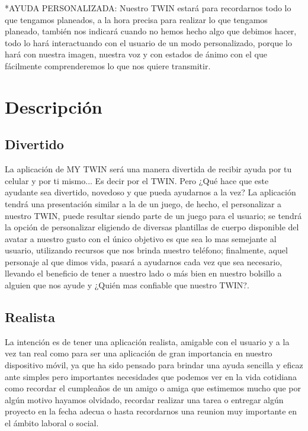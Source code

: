\documentclass[12pt]{article}
\begin{document}
\hspace{0.2in}*AYUDA PERSONALIZADA: Nuestro TWIN estará para recordarnos todo lo que tengamos planeados, a la hora precisa para realizar lo que tengamos planeado, también nos indicará cuando no hemos hecho algo que debimos hacer, todo lo hará interactuando con el usuario de un modo personalizado, porque lo hará con nuestra imagen, nuestra voz y con estados de ánimo con el que fácilmente comprenderemos lo que nos quiere transmitir.

\newpage
\section{Descripción}

\subsection{Divertido}
La aplicación de MY TWIN será una manera divertida de recibir ayuda por tu celular y por ti mismo... Es decir por el TWIN.
Pero ¿Qué hace que este ayudante sea divertido, novedoso y que pueda ayudarnos a la vez?
La aplicación tendrá una presentación similar a la de un juego, de hecho, el personalizar a nuestro TWIN, puede resultar siendo parte de un juego para el usuario; se tendrá la opción de personalizar eligiendo de diversas plantillas de cuerpo disponible del avatar a nuestro gusto con el único objetivo es que sea lo mas semejante al usuario, utilizando recursos que nos brinda nuestro teléfono; finalmente, aquel personaje al que dimos vida, pasará a ayudarnos cada vez que sea necesario, llevando el beneficio de tener a nuestro lado o más bien en nuestro bolsillo a alguien que nos ayude y ¿Quién mas confiable que nuestro TWIN?.

\subsection{Realista}
La intención es de tener una aplicación realista, amigable con el usuario y a la vez tan real como para ser una aplicación de gran importancia en nuestro dispositivo móvil, ya que ha sido pensado para brindar una ayuda sencilla y eficaz ante simples pero importantes necesidades que podemos ver en la vida cotidiana como recordar el cumpleaños de un amigo o amiga que estimemos mucho que por algún motivo hayamos olvidado, recordar realizar una tarea o entregar algún proyecto en la fecha adecua o hasta recordarnos una reunion muy importante en el ámbito laboral o social.
\end{document}
